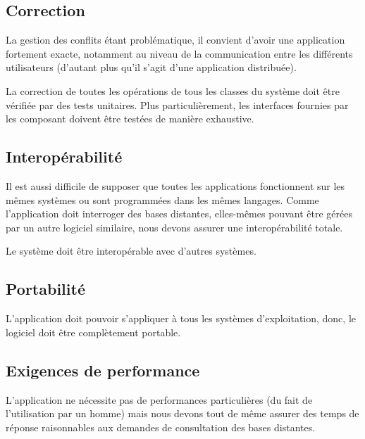 
\subsection{Correction}
 La gestion des conflits étant problématique, il convient d'avoir une application fortement exacte, notamment au niveau de la communication entre les différents utilisateurs (d'autant plus qu'il s'agit d'une application distribuée). 

\begin{requirement}[Correction]
	La correction de toutes les opérations de tous les classes du système doit être vérifiée par des tests unitaires. 
	Plus particulièrement, les interfaces fournies par les composant doivent être testées de manière exhaustive.
\end{requirement}


 \subsection{Interopérabilité}
Il est aussi difficile de supposer que toutes les applications fonctionnent sur les mêmes systèmes ou sont programmées dans les mêmes langages.
Comme l'application doit interroger des bases distantes, elles-mêmes pouvant être gérées par un autre logiciel similaire, nous devons assurer une interopérabilité totale. 
 
\begin{requirement}[Interopérabilité]
	Le système doit être interopérable avec d'autres systèmes.
\end{requirement}
 

\subsection{Portabilité}
\begin{requirement}[Portabilité]
	L'application doit pouvoir s'appliquer à tous les systèmes d'exploitation, donc, le logiciel doit être complètement portable.
\end{requirement}



\subsection{Exigences de performance}
L'application ne nécessite pas de performances particulières (du fait de l'utilisation par un homme) mais nous devons tout de même assurer des temps de réponse raisonnables aux demandes de consultation des bases distantes.
	
